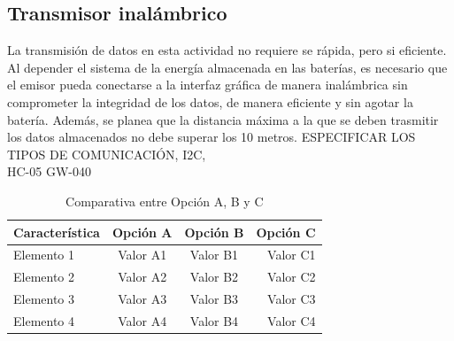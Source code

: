\documentclass[a4paper,12pt]{article}
\begin{document}
\subsection{Transmisor inalámbrico}
La transmisión de datos en esta actividad no requiere se rápida, pero si eficiente. Al depender el sistema de la energía almacenada en las baterías, es necesario que el emisor pueda conectarse a la interfaz gráfica de manera inalámbrica sin comprometer la integridad de los datos, de manera eficiente y sin agotar la batería. Además, se planea que la distancia máxima a la que se deben trasmitir los datos almacenados no debe superar los 10 metros. ESPECIFICAR LOS TIPOS DE COMUNICACIÓN, I2C, \\
HC-05 GW-040 \\

\begin{table}[H]
\centering
    \begin{tabular}{|l|c|c|r|}
    \hline
    \textbf{Característica} & \textbf{Opción A} & \textbf{Opción B} & \textbf{Opción C} \\
    \hline
    Elemento 1 & Valor A1 & Valor B1 & Valor C1 \\
    \hline
    Elemento 2 & Valor A2 & Valor B2 & Valor C2 \\
    \hline
    Elemento 3 & Valor A3 & Valor B3 & Valor C3 \\
    \hline
    Elemento 4 & Valor A4 & Valor B4 & Valor C4 \\
    \hline
    \end{tabular}
    \caption{Comparativa entre Opción A, B y C}
    \label{tab:comparativa}
\end{table}
\end{document}
